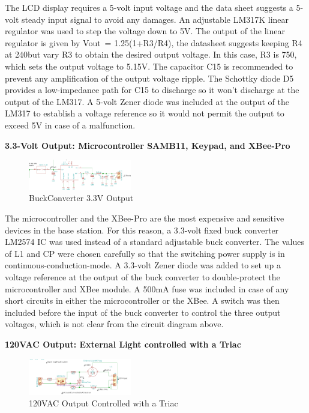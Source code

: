 \documentclass[journal,compsoc]{IEEEtran}
\begin{document}
The LCD display requires a 5-volt input voltage and the data sheet suggests a 5-volt steady input signal to avoid any damages.  An adjustable LM317K linear regulator was used to step the voltage down to 5V.  The output of the linear regulator is given by Vout~= 1.25(1+R3/R4), the datasheet suggests keeping R4 at 240\Omega but vary R3 to obtain the desired output voltage.  In this case, R3 is 750\Omega, which sets the output voltage to 5.15V.  The capacitor C15 is recommended to prevent any amplification of the output voltage ripple.  The Schottky diode D5 provides a low-impedance path for C15 to discharge so it won’t discharge at the output of the LM317.  A 5-volt Zener diode was included at the output of the LM317 to establish a voltage reference so it would not permit the output to exceed 5V in case of a malfunction.


\textbf {3.3-Volt Output: Microcontroller SAMB11, Keypad, and XBee-Pro
}

\begin{figure}[ht]	%
\centering
\includegraphics[width=0.4\textwidth]{Buck.png}
\caption{ BuckConverter 3.3V Output }
\label{PConverter}
\end{figure}

The microcontroller and the XBee-Pro are the most expensive and sensitive devices in the base station. For this reason, a 3.3-volt fixed buck converter LM2574 IC was used instead of a standard adjustable buck converter.  The values of L1 and CP were chosen carefully so that the switching power supply is in continuous-conduction-mode.  A 3.3-volt Zener diode was added to set up a voltage reference at the output of the buck converter to double-protect the microcontroller and XBee module.  A 500mA fuse was included in case of any short circuits in either the microcontroller or the XBee.  A switch was then included before the input of the buck converter to control the three output voltages, which is not clear from the circuit diagram above.

\textbf {120VAC Output: External Light controlled with a Triac}

\begin{figure}[ht]	%
\centering
\includegraphics[width=0.4\textwidth]{Triac.png}
\caption{ 120VAC Output Controlled with a Triac}
\label{PTriac}
\end{figure}
\end{document}
